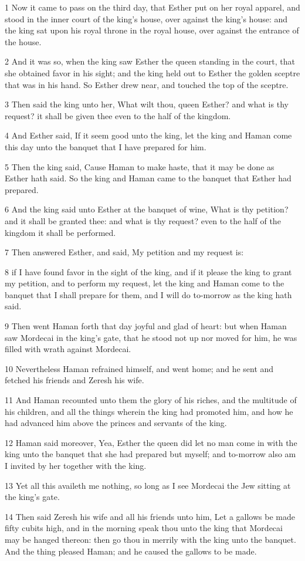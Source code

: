 \par 1 Now it came to pass on the third day, that Esther put on her royal apparel, and stood in the inner court of the king's house, over against the king's house: and the king sat upon his royal throne in the royal house, over against the entrance of the house.
\par 2 And it was so, when the king saw Esther the queen standing in the court, that she obtained favor in his sight; and the king held out to Esther the golden sceptre that was in his hand. So Esther drew near, and touched the top of the sceptre.
\par 3 Then said the king unto her, What wilt thou, queen Esther? and what is thy request? it shall be given thee even to the half of the kingdom.
\par 4 And Esther said, If it seem good unto the king, let the king and Haman come this day unto the banquet that I have prepared for him.
\par 5 Then the king said, Cause Haman to make haste, that it may be done as Esther hath said. So the king and Haman came to the banquet that Esther had prepared.
\par 6 And the king said unto Esther at the banquet of wine, What is thy petition? and it shall be granted thee: and what is thy request? even to the half of the kingdom it shall be performed.
\par 7 Then answered Esther, and said, My petition and my request is:
\par 8 if I have found favor in the sight of the king, and if it please the king to grant my petition, and to perform my request, let the king and Haman come to the banquet that I shall prepare for them, and I will do to-morrow as the king hath said.
\par 9 Then went Haman forth that day joyful and glad of heart: but when Haman saw Mordecai in the king's gate, that he stood not up nor moved for him, he was filled with wrath against Mordecai.
\par 10 Nevertheless Haman refrained himself, and went home; and he sent and fetched his friends and Zeresh his wife.
\par 11 And Haman recounted unto them the glory of his riches, and the multitude of his children, and all the things wherein the king had promoted him, and how he had advanced him above the princes and servants of the king.
\par 12 Haman said moreover, Yea, Esther the queen did let no man come in with the king unto the banquet that she had prepared but myself; and to-morrow also am I invited by her together with the king.
\par 13 Yet all this availeth me nothing, so long as I see Mordecai the Jew sitting at the king's gate.
\par 14 Then said Zeresh his wife and all his friends unto him, Let a gallows be made fifty cubits high, and in the morning speak thou unto the king that Mordecai may be hanged thereon: then go thou in merrily with the king unto the banquet. And the thing pleased Haman; and he caused the gallows to be made.

